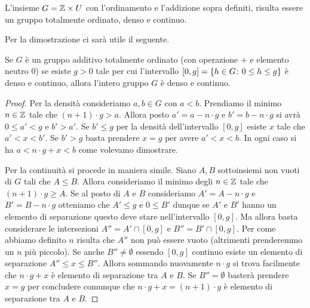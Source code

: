 \begin{theorem}%
  \label{th:gruppo_su_U}%
L'insieme $G={\mathbb Z} \times U$ con l'ordinamento 
e l'addizione sopra definiti, risulta essere un gruppo 
totalmente ordinato, denso e continuo.
\end{theorem}
%
Per la dimostrazione ci sarà utile il seguente.
%
\begin{lemma} Se $G$ è un gruppo additivo totalmente ordinato 
(con operazione $+$ e elemento neutro $0$) 
se esiste $g>0$ tale per cui l'intervallo 
$[0,g] = {\left\{ h\in G\colon 0 \le h \le g \right\}}$ 
è denso e continuo, allora l'intero gruppo $G$ è denso
e continuo.  
\end{lemma}
%
\begin{proof}
Per la densità consideriamo $a,b\in G$ con $a<b$. 
Prendiamo il minimo $n\in {\mathbb Z}$ tale che $(n+1)\cdot g > a$.
%
%
Allora posto $a'=a-n\cdot g$ e $b'=b-n\cdot g$
si avrà $0\le a' < g$ e $b'>a'$.
Se $b'\le g$ per la densità dell'intervallo $[0,g]$ 
esiste $x$ tale che $a'<x<b'$. 
Se $b'>g$ basta prendere $x=g$ per avere $a'<x<b$.
In ogni caso si ha $a < n\cdot g + x < b$ 
come volevamo dimostrare.

Per la continuità si procede in maniera simile.
Siano $A,B$ sottoinsiemi non vuoti di $G$ tali che 
$A\le B$.
Allora consideriamo il minimo degli $n\in {\mathbb Z}$ 
tale che $(n+1)\cdot g\ge A$.
Se al posto di $A$ e $B$ consideriamo $A'=A-n\cdot g$ 
e $B'=B-n\cdot g$ otteniamo 
che $A'\le g$ e $0\le B'$
dunque se $A'$ e $B'$ hanno un elemento di separazione 
questo deve stare nell'intervallo $[0,g]$.
Ma allora basta considerare le intersezioni $A''=A'\cap [0,g]$ 
e $B''=B'\cap [0,g]$. 
Per come abbiamo definito $n$ risulta che $A''$ non può essere 
vuoto (altrimenti prenderemmo un $n$ più piccolo).
Se anche $B''\neq \emptyset$ 
essendo $[0,g]$ continuo 
esiste un elemento di separazione $A'' \le x \le B''$.
Allora sommando nuovamente $n\cdot g$ si trova 
facilmente che $n\cdot g+ x$ è elemento di separazione 
tra $A$ e $B$. 
Se $B''=\emptyset$ basterà prendere $x=g$ per concludere 
comunque che $n\cdot g + x=(n+1)\cdot g$ 
è elemento di separazione tra $A$ e $B$.
\end{proof}
%
